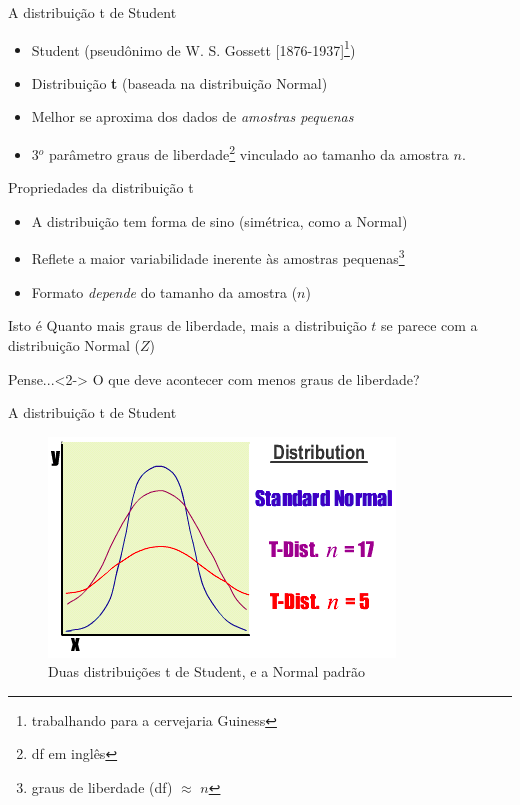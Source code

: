 \documentclass{beamer}
\begin{document}
\begin{frame}{A distribuição t de Student}
  \begin{itemize}
  \item Student (pseudônimo de W. S. Gossett [1876-1937]\footnote{trabalhando
    para a cervejaria Guiness})
  \item Distribuição {\bf t} ({\footnotesize baseada na distribuição Normal})
  \item Melhor se aproxima dos dados de {\em amostras pequenas}
  \item 3$^o$ parâmetro \alert{graus de liberdade}\footnote{df em inglês} {\footnotesize vinculado ao tamanho da amostra $n$}.
  \end{itemize}
\end{frame}

\begin{frame}{Propriedades da distribuição t}
  \begin{itemize}
  \item A distribuição tem forma de sino {\footnotesize(simétrica, como a Normal)}
  \item Reflete a maior variabilidade \alert{inerente} às amostras pequenas\footnote{graus de liberdade (df) $\approx$ $n$}
  \item Formato {\em depende} do tamanho da amostra ($n$) %
  \end{itemize}
  \begin{block}{Isto é}
    Quanto mais graus de liberdade, mais a distribuição $t$ se parece com a distribuição Normal ($Z$)
  \end{block}
  \begin{block}{Pense...}<2->
    O que deve acontecer com \alert{menos} graus de liberdade?
  \end{block}
\end{frame}

\begin{frame}{A distribuição t de Student}
  \begin{figure}
    \includegraphics[height=0.7\textheight]{Inf_II/t_graph}
    \caption{\footnotesize Duas distribuições t de Student, e a Normal padrão}
  \end{figure}
\end{frame}
\end{document}
